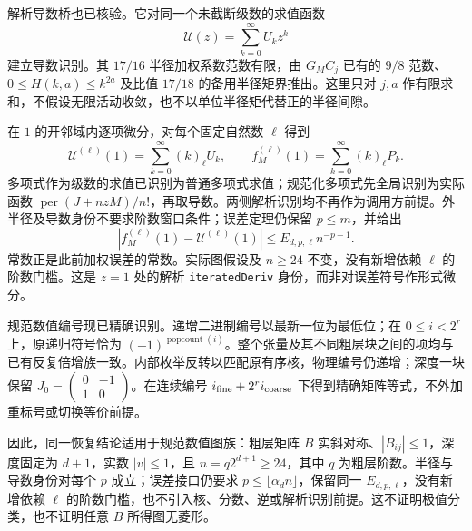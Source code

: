 \documentclass[UTF8,11pt,fontset=fandol]{ctexart}
\begin{document}
解析导数桥也已核验。它对同一个未截断级数的求值函数
\[
 \mathcal U(z)=\sum_{k=0}^{\infty}U_kz^k
\]
建立导数识别。其 $17/16$ 半径加权系数范数有限，由 $G_MC_j$ 已有的 $9/8$ 范数、$0\le H(k,a)\le k^{2a}$ 及比值 $17/18$ 的备用半径矩界推出。这里只对 $j,a$ 作有限求和，不假设无限活动收敛，也不以单位半径矩代替正的半径间隙。

在 $1$ 的开邻域内逐项微分，对每个固定自然数 $\ell$ 得到
\[
 \mathcal U^{(\ell)}(1)=\sum_{k=0}^{\infty}(k)_\ell U_k,
 \qquad f_M^{(\ell)}(1)=\sum_{k=0}^{\infty}(k)_\ell P_k.
\]
多项式作为级数的求值已识别为普通多项式求值；规范化多项式先全局识别为实际函数 $\operatorname{per}(J+nzM)/n!$，再取导数。两侧解析识别均不再作为调用方前提。外半径及导数身份不要求阶数窗口条件；误差定理仍保留 $p\le m$，并给出
\[
 \left|f_M^{(\ell)}(1)-\mathcal U^{(\ell)}(1)\right|
 \le E_{d,p,\ell}n^{-p-1}.
\]
常数正是此前加权误差的常数。实际图假设及 $n\ge24$ 不变，没有新增依赖 $\ell$ 的阶数门槛。这是 $z=1$ 处的解析 \texttt{iteratedDeriv} 身份，而非对误差符号作形式微分。

规范数值编号现已精确识别。递增二进制编号以最新一位为最低位；在 $0\le i<2^r$ 上，原递归符号恰为 $(-1)^{\operatorname{popcount}(i)}$。整个张量及其不同粗层块之间的项均与已有反复倍增族一致。内部枚举反转以匹配原有序核，物理编号仍递增；深度一块保留 $J_0=\left(\begin{smallmatrix}0&-1\\1&0\end{smallmatrix}\right)$。在连续编号 $i_{\rm fine}+2^r i_{\rm coarse}$ 下得到精确矩阵等式，不外加重标号或切换等价前提。

因此，同一恢复结论适用于规范数值图族：粗层矩阵 $B$ 实斜对称、$|B_{ij}|\le1$，深度固定为 $d+1$，实数 $|v|\le1$，且 $n=q2^{d+1}\ge24$，其中 $q$ 为粗层阶数。半径与导数身份对每个 $p$ 成立；误差接口仍要求 $p\le\lfloor\alpha_dn\rfloor$，保留同一 $E_{d,p,\ell}$，没有新增依赖 $\ell$ 的阶数门槛，也不引入核、分数、逆或解析识别前提。这不证明极值分类，也不证明任意 $B$ 所得图无菱形。
\end{document}
